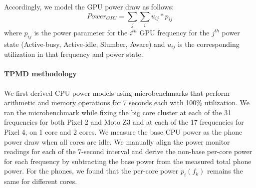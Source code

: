 Accordingly, we model the GPU power draw as follows:
\begin{equation}
    Power_{GPU} = \sum_{j}\sum_{i} u_{ij}*p_{ij}
    \end{equation}
where $p_{ij}$ is the power parameter for the $i^{th}$ GPU frequency for the $j^{th}$ power state (Active-busy, Active-idle, Slumber, Aware) and $u_{ij}$ is the corresponding utilization in that frequency and power state.
\fi

\paragraph{TPMD methodology}
We first derived CPU power models using microbenchmarks that perform arithmetic and memory operations for 7 seconds each 
with 100\% utilization.
We ran the microbenchmark while fixing the big core cluster at each of the 31 frequencies for both Pixel 2 and Moto Z3 and at each of the 17 frequencies for Pixel 4, 
on 1 core and 2 cores.
We measure the base CPU power as the phone power draw when all cores are idle.
We manually align the power monitor readings for each of the 7-second interval 
and derive the non-base per-core power for each frequency by 
subtracting the base power from the measured total phone power.
{For the phones, we found that the per-core power $p_i(f_k)$ remains the same for different cores.}


